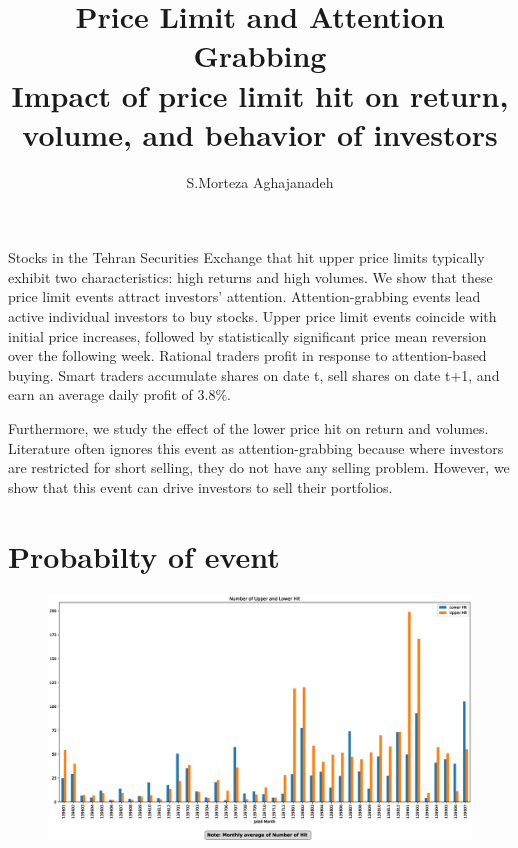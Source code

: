 \documentclass[12pt]{article}
\begin{document}
\nopagebreak
{}
\title{
 Price Limit and Attention Grabbing \\
  \large 
 Impact of price limit hit on return, volume, and behavior of investors
  }
\author{S.Morteza Aghajanadeh}
\nopagebreak
{\maketitle}

Stocks in the Tehran Securities Exchange that hit upper price limits typically exhibit two characteristics: high
returns and high volumes. We show that these price limit events attract investors' attention.
Attention-grabbing events lead active individual investors to buy stocks.
Upper price limit events coincide with initial price increases, followed by statistically
significant price mean reversion over the following week.
 Rational traders profit in
response to attention-based buying. Smart traders accumulate shares on date t, sell shares on date t+1, and
earn an average daily profit of 3.8\%. 

Furthermore, we study the effect of the lower price hit on return and volumes. Literature often ignores this event as attention-grabbing because where investors are restricted for short selling, they do not have any selling problem. However, we show that this event can drive investors to sell their portfolios. 




\section{Probabilty of event}


\begin{landscape}
\begin{figure}
\centering
\includegraphics[width=1\linewidth ]{MNH.eps}
\caption{}
\label{fig:mnh}
\end{figure}
\end{landscape}
\end{document}
